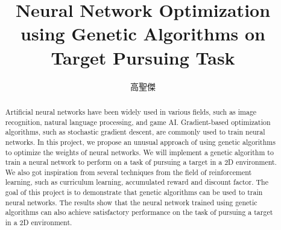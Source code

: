 \documentclass[sigconf]{acmart}
\begin{document}
\title{Neural Network Optimization using Genetic Algorithms on Target Pursuing Task}

\begin{CJK}{UTF8}{bkai}
  \author{高聖傑}

\renewcommand{\shortauthors}{Kao, Sheng-Jie}

\begin{abstract}
Artificial neural networks have been widely used in various fields, such as image recognition, natural language processing, and game AI. Gradient-based optimization algorithms, such as stochastic gradient descent, are commonly used to train neural networks. In this project, we propose an unusual approach of using genetic algorithms to optimize the weights of neural networks. We will implement a genetic algorithm to train a neural network to perform on a task of pursuing a target in a 2D environment. We also got inspiration from several techniques from the field of reinforcement learning, such as curriculum learning, accumulated reward and discount factor. The goal of this project is to demonstrate that genetic algorithms can be used to train neural networks. The results show that the neural network trained using genetic algorithms can also achieve satisfactory performance on the task of pursuing a target in a 2D environment. 
\end{abstract}

\maketitle
\end{CJK}
\end{document}
